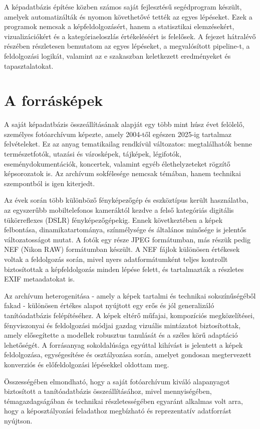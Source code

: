A képadatbázis építése közben számos saját fejlesztésű segédprogram készült, amelyek automatizálták és nyomon követhetővé tették az egyes lépéseket. Ezek a programok nemcsak a képfeldolgozásért, hanem a statisztikai elemzésekért, vizualizációkért és a kategóriaeloszlás értékeléséért is felelősek. A fejezet hátralévő részében részletesen bemutatom az egyes lépéseket, a megvalósított pipeline-t, a feldolgozási logikát, valamint az e szakaszban keletkezett eredményeket és tapasztalatokat.

    \section{A forrásképek}
        A saját képadatbázis összeállításának alapját egy több mint húsz évet felölelő, személyes fotóarchívum képezte, amely 2004-től egészen 2025-ig tartalmaz felvételeket. Ez az anyag tematikailag rendkívül változatos: megtalálhatók benne természetfotók, utazási és városképek, tájképek, légifotók, eseménydokumentációk, koncertek, valamint egyéb élethelyzeteket rögzítő képsorozatok is. Az archívum sokfélesége nemcsak témában, hanem technikai szempontból is igen kiterjedt.

        Az évek során több különböző fényképezőgép és eszköztípus került használatba, az egyszerűbb mobiltelefonos kameráktól kezdve a felső kategóriás digitális tükörreflexes (DSLR) fényképezőgépekig. Ennek következtében a képek felbontása, dinamikatartománya, színmélysége és általános minősége is jelentős változatosságot mutat. A fotók egy része JPEG formátumban, más részük pedig NEF (Nikon RAW) formátumban készült. A NEF fájlok különösen értékesek voltak a feldolgozás során, mivel nyers adatformátumként teljes kontrollt biztosítottak a képfeldolgozás minden lépése felett, és tartalmazták a részletes EXIF metaadatokat is.

        Az archívum heterogenitása - amely a képek tartalmi és technikai sokszínűségéből fakad - különösen értékes alapot nyújtott egy erős és jól generalizáló tanítóadatbázis felépítéséhez. A képek eltérő műfajai, kompozíciós megközelítései, fényviszonyai és feldolgozási módjai gazdag vizuális mintázatot biztosítottak, amely elősegítette a modellek robusztus tanulását és a széles körű adaptáció lehetőségét. A forrásanyag sokoldalúsága egyúttal kihívást is jelentett a képek feldolgozása, egységesítése és osztályozása során, amelyet gondosan megtervezett konverziós és előfeldolgozási lépésekkel oldottam meg.

        Összességében elmondható, hogy a saját fotóarchívum kiváló alapanyagot biztosított a tanítóadatbázis összeállításához, mivel mennyiségében, témagazdagságában és technikai részletességében egyaránt alkalmas volt arra, hogy a képosztályozási feladathoz megbízható és reprezentatív adatforrást nyújtson.

